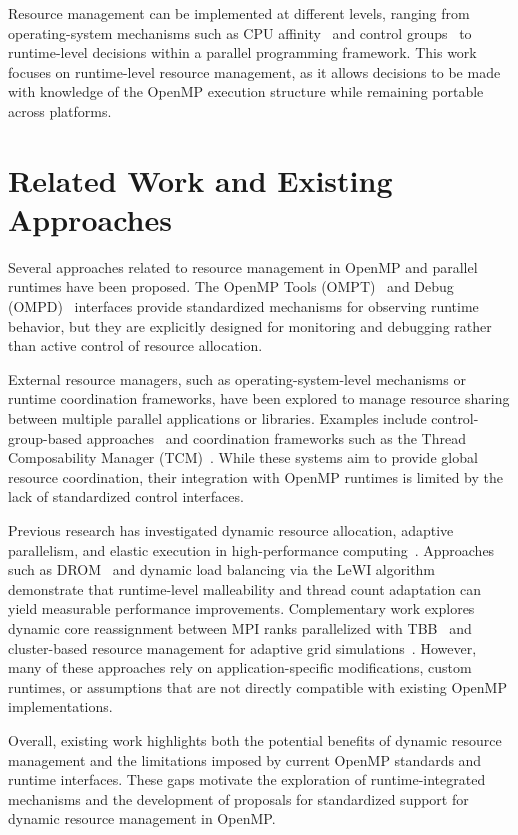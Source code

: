 Resource management can be implemented at different levels, ranging from operating-system mechanisms such as CPU affinity~\parencite{eichenberger2012affinity} and control groups~\parencite{menage2004cgroups} to runtime-level decisions within a parallel programming framework. This work focuses on runtime-level resource management, as it allows decisions to be made with knowledge of the OpenMP execution structure while remaining portable across platforms.

\section{Related Work and Existing Approaches}

Several approaches related to resource management in OpenMP and parallel runtimes have been proposed. The OpenMP Tools (OMPT)~\parencite{Eichenberger2013ompt} and Debug (OMPD)~\parencite{Protze2015ompd} interfaces provide standardized mechanisms for observing runtime behavior, but they are explicitly designed for monitoring and debugging rather than active control of resource allocation.

External resource managers, such as operating-system-level mechanisms or runtime coordination frameworks, have been explored to manage resource sharing between multiple parallel applications or libraries. Examples include control-group-based approaches~\parencite{menage2004cgroups} and coordination frameworks such as the Thread Composability Manager (TCM)~\parencite{fedotov_case_nodate}. While these systems aim to provide global resource coordination, their integration with OpenMP runtimes is limited by the lack of standardized control interfaces.

Previous research has investigated dynamic resource allocation, adaptive parallelism, and elastic execution in high-performance computing~\parencite{Aliaga2022survey}. Approaches such as DROM~\parencite{damico_drom_2018} and dynamic load balancing via the LeWI algorithm~\parencite{garcia2014hints} demonstrate that runtime-level malleability and thread count adaptation can yield measurable performance improvements. Complementary work explores dynamic core reassignment between MPI ranks parallelized with TBB~\parencite{schreiber_case_2018} and cluster-based resource management for adaptive grid simulations~\parencite{schreiber_cluster-based_nodate}. However, many of these approaches rely on application-specific modifications, custom runtimes, or assumptions that are not directly compatible with existing OpenMP implementations.

Overall, existing work highlights both the potential benefits of dynamic resource management and the limitations imposed by current OpenMP standards and runtime interfaces. These gaps motivate the exploration of runtime-integrated mechanisms and the development of proposals for standardized support for dynamic resource management in OpenMP.
